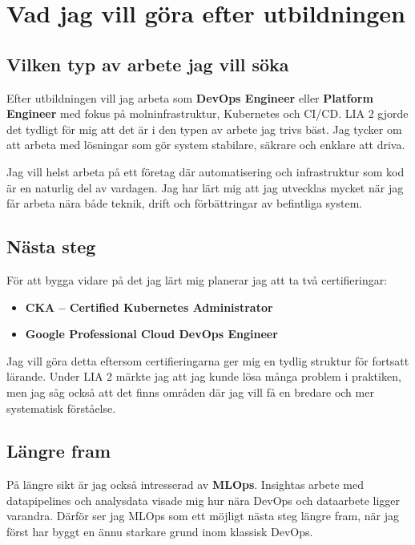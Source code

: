 \section{Vad jag vill göra efter utbildningen}
\label{sec:framtida_planer}

\subsection*{Vilken typ av arbete jag vill söka}

Efter utbildningen vill jag arbeta som \textbf{DevOps Engineer} eller \textbf{Platform Engineer}
med fokus på molninfrastruktur, Kubernetes och CI/CD. LIA 2 gjorde det tydligt för mig att det
är i den typen av arbete jag trivs bäst. Jag tycker om att arbeta med lösningar som gör system
stabilare, säkrare och enklare att driva.

Jag vill helst arbeta på ett företag där automatisering och infrastruktur som kod är en naturlig
del av vardagen. Jag har lärt mig att jag utvecklas mycket när jag får arbeta nära både teknik,
drift och förbättringar av befintliga system.

\subsection*{Nästa steg}

För att bygga vidare på det jag lärt mig planerar jag att ta två certifieringar:

\begin{itemize}
      \item \textbf{CKA -- Certified Kubernetes Administrator}
      \item \textbf{Google Professional Cloud DevOps Engineer}
\end{itemize}

Jag vill göra detta eftersom certifieringarna ger mig en tydlig struktur för fortsatt lärande.
Under LIA 2 märkte jag att jag kunde lösa många problem i praktiken, men jag såg också att det
finns områden där jag vill få en bredare och mer systematisk förståelse.

\subsection*{Längre fram}

På längre sikt är jag också intresserad av \textbf{MLOps}. Insightas arbete med datapipelines
och analysdata visade mig hur nära DevOps och dataarbete ligger varandra. Därför ser jag MLOps
som ett möjligt nästa steg längre fram, när jag först har byggt en ännu starkare grund inom
klassisk DevOps.